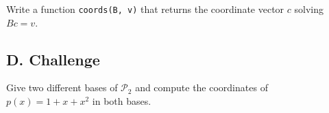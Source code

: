 \begin{exercise}
Write a function \texttt{coords(B, v)} that returns the coordinate vector
$c$ solving $Bc=v$.
\end{exercise}

\subsection*{D. Challenge}

\begin{exercise}
Give two different bases of $\mathcal P_2$ and compute the coordinates of
$p(x)=1+x+x^2$ in both bases.
\end{exercise}
